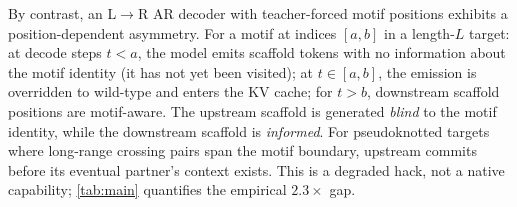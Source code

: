 \documentclass{article}
\begin{document}
By contrast, an L$\to$R AR decoder with teacher-forced motif positions
exhibits a position-dependent asymmetry. For a motif at indices
$[a, b]$ in a length-$L$ target: at decode steps $t < a$, the model
emits scaffold tokens with no information about the motif identity (it
has not yet been visited); at $t \in [a, b]$, the emission is overridden
to wild-type and enters the KV cache; for $t > b$, downstream scaffold
positions are motif-aware. The upstream scaffold is generated
\emph{blind} to the motif identity, while the downstream scaffold is
\emph{informed}. For pseudoknotted targets where long-range crossing
pairs span the motif boundary, upstream commits before its eventual
partner's context exists. This is a degraded hack, not a native
capability; \cref{tab:main} quantifies the empirical
$2.3\times$ gap.

\end{document}
